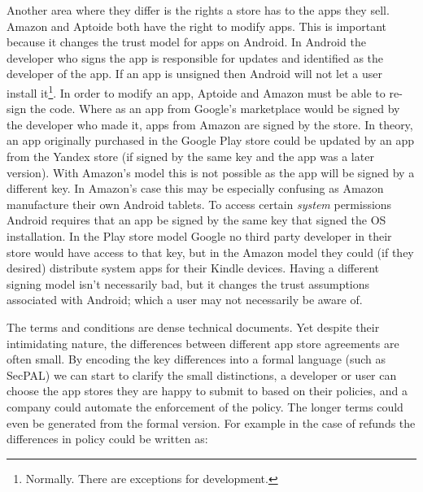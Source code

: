 \documentclass[thesis.tex]{subfiles}
\begin{document}
Another area where they differ is the rights a store has to the apps they sell.
Amazon and Aptoide both have the right to modify apps.
This is important because it changes the trust model for apps on Android.
In Android the developer who signs the app is responsible for updates and identified as the developer of the app.  If an app is unsigned then Android will not let a user install it\footnote{Normally. There are exceptions for development.}.  In order to modify an app, Aptoide and Amazon must be able to re-sign the code.  Where as an app from Google's marketplace would be signed by the developer who made it, apps from Amazon are signed by the store.
In theory, an app originally purchased in the Google Play store could be updated by an app from the Yandex store (if signed by the same key and the app was a later version).
With Amazon's model this is not possible as the app will be signed by a different key.
In Amazon's case this may be especially confusing as Amazon manufacture their own Android tablets.
To access certain \emph{system} permissions Android requires that an app be signed by the same key that signed the OS installation.
In the Play store model Google no third party developer in their store would have access to that key, but in the Amazon model they could (if they desired) distribute system apps for their Kindle devices.
Having a different signing model isn't necessarily bad, but it changes the trust assumptions associated with Android; which a user may not necessarily be aware of.


The terms and conditions are dense technical documents.
Yet despite their intimidating nature, the differences between different app store agreements are often small.
By encoding the key differences into a formal language (such as SecPAL) we can start to clarify the small distinctions, a developer or user can choose the app stores they are happy to submit to based on their policies, and a company could automate the enforcement of the policy.
The longer terms could even be generated from the formal version.
For example in the case of refunds the differences in policy could be written as:
\end{document}
